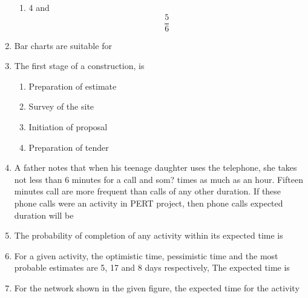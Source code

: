 \documentclass[11pt,a4paper]{article}
\begin{document}
\begin{enumerate}
\begin{enumerate}[label=\Alph*.]
\item{4 and $$\frac{5}{6}$$}
\end{enumerate}
\item{Bar charts are suitable for}
\\
\item{The first stage of a construction, is}
\begin{enumerate}[label=\Alph*.]
\item{Preparation of estimate}
\item{Survey of the site}
\item{Initiation of proposal}
\item{Preparation of tender}
\end{enumerate}
\item{A father notes that when his teenage daughter uses the telephone, she takes not less than 6 minutes for a call and som? times as much as an hour. Fifteen minutes call are more frequent than calls of any other duration. If these phone calls were an activity in PERT project, then phone calls expected duration will be}
\\
\item{The probability of completion of any activity within its expected time is}
\\
\item{For a given activity, the optimistic time, pessimistic time and the most probable estimates are 5, 17 and 8 days respectively, The expected time is}
\\
\item{For the network shown in the given figure, the expected time for the activity \\

}
\end{enumerate}
\end{document}
